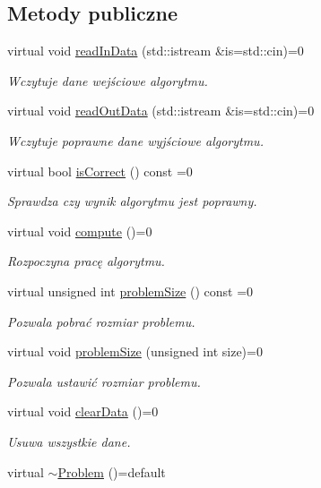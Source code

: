 \subsection*{Metody publiczne}
\begin{DoxyCompactItemize}
\item 
virtual void \hyperlink{class_problem_a8e3f5755480a44a5dfe767b5429572c9}{read\-In\-Data} (std\-::istream \&is=std\-::cin)=0
\begin{DoxyCompactList}\small\item\em Wczytuje dane wejściowe algorytmu. \end{DoxyCompactList}\item 
virtual void \hyperlink{class_problem_af92be524acb6f1d6b484eff1fce07d2c}{read\-Out\-Data} (std\-::istream \&is=std\-::cin)=0
\begin{DoxyCompactList}\small\item\em Wczytuje poprawne dane wyjściowe algorytmu. \end{DoxyCompactList}\item 
virtual bool \hyperlink{class_problem_a55aef8681a2282a431abb77039cd01c1}{is\-Correct} () const =0
\begin{DoxyCompactList}\small\item\em Sprawdza czy wynik algorytmu jest poprawny. \end{DoxyCompactList}\item 
virtual void \hyperlink{class_problem_a278fa7a764e308758dbf9c07757ef037}{compute} ()=0
\begin{DoxyCompactList}\small\item\em Rozpoczyna pracę algorytmu. \end{DoxyCompactList}\item 
virtual unsigned int \hyperlink{class_problem_a938aceef78b28c64c03616a3fa619ec0}{problem\-Size} () const =0
\begin{DoxyCompactList}\small\item\em Pozwala pobrać rozmiar problemu. \end{DoxyCompactList}\item 
virtual void \hyperlink{class_problem_aa67aec5ea247cc9e6616a71345399a08}{problem\-Size} (unsigned int size)=0
\begin{DoxyCompactList}\small\item\em Pozwala ustawić rozmiar problemu. \end{DoxyCompactList}\item 
virtual void \hyperlink{class_problem_ad44a9ce61243b8f5c396795262990b82}{clear\-Data} ()=0
\begin{DoxyCompactList}\small\item\em Usuwa wszystkie dane. \end{DoxyCompactList}\item 
virtual \hyperlink{class_problem_ab31e378c1a54e149c8c6df5f6a534cad}{$\sim$\-Problem} ()=default
\end{DoxyCompactItemize}


